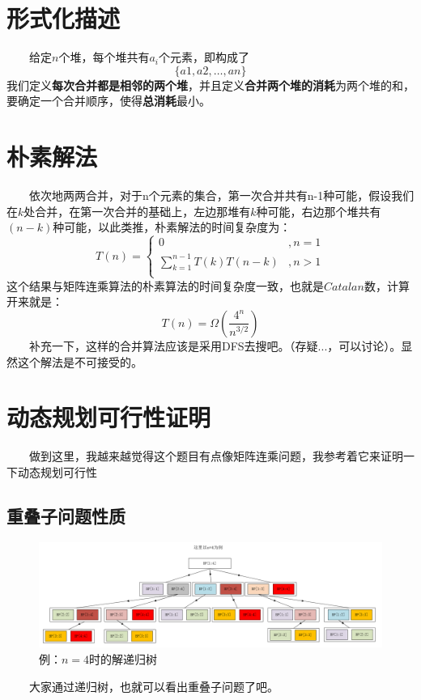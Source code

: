 \documentclass[11pt]{ctexart}
\begin{document}
\section{形式化描述}
\noindent　　给定$n$个堆，每个堆共有$a_{i}$个元素，即构成了$$\{a1,a2,\dots,an\}$$我们定义\textbf{每次合并都是相邻的两个堆}，并且定义\textbf{合并两个堆的消耗}为两个堆的和，要确定一个合并顺序，使得\textbf{总消耗}最小。

\section{朴素解法}
\noindent　　依次地两两合并，对于n个元素的集合，第一次合并共有n-1种可能，假设我们在$k$处合并，在第一次合并的基础上，左边那堆有$k$种可能，右边那个堆共有$(n-k)$种可能，以此类推，朴素解法的时间复杂度为：
\begin{equation}
T(n) = \left\{
\begin{array}{cc}
0&, n=1\\
\sum\limits_{k=1}^{n-1}T(k)T(n-k)&, n>1\\
\end{array}
\right.
\end{equation}
这个结果与矩阵连乘算法的朴素算法的时间复杂度一致，也就是$Catalan$数，计算开来就是：
\begin{equation}
T(n) = \Omega{
\left(\frac{4^{n}}{n^{3/2}}\right)}
\end{equation}
\noindent　　补充一下，这样的合并算法应该是采用DFS去搜吧。（存疑...，可以讨论）。显然这个解法是不可接受的。

\section{动态规划可行性证明}
\noindent　　做到这里，我越来越觉得这个题目有点像矩阵连乘问题，我参考着它来证明一下动态规划可行性

\subsection{重叠子问题性质}
\begin{figure}[H]
\centering
\includegraphics[scale=0.5]{tree.png}
\caption{例：$n=4$时的解递归树}
\end{figure}
\noindent　　大家通过递归树，也就可以看出重叠子问题了吧。
\end{document}
